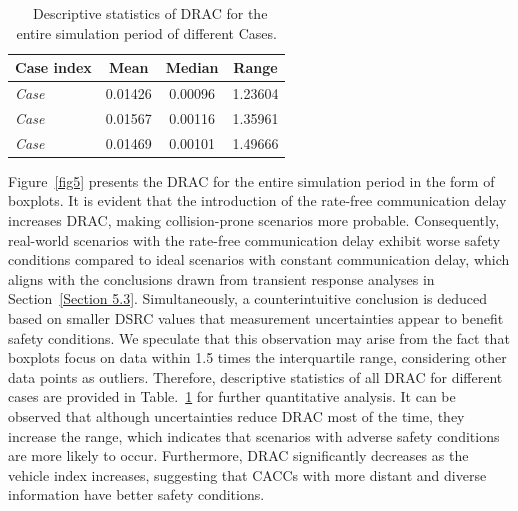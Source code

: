 \documentclass[a4paper]{cas-sc}
\begin{document}
\begin{table}
  \centering
  \setlength{\abovecaptionskip}{0pt}
  \setlength{\belowcaptionskip}{10pt}%
    \caption{~Descriptive statistics of DRAC for the entire simulation period of different Cases.}
    \label{table2}
    {\begin{tabular}{lccc} \toprule
        Case index                              & 
         Mean       & Median    &  Range    \\ \midrule
        \textit{Case \uppercase\expandafter{\romannumeral1}}                   & 0.01426  & 0.00096 &  1.23604     \\
        \textit{Case \uppercase\expandafter{\romannumeral2}}      & 0.01567 & 0.00116 &   1.35961         \\
        \textit{Case \uppercase\expandafter{\romannumeral3}}                    & 0.01469 & 0.00101 &  1.49666 \\
        \bottomrule
      \end{tabular}}
\end{table}

Figure~\ref{fig5} presents the DRAC for the entire simulation period in the form of boxplots. It is evident that the introduction of the rate-free communication delay increases DRAC, making collision-prone scenarios more probable. Consequently, real-world scenarios with the rate-free communication delay exhibit worse safety conditions compared to ideal scenarios with constant communication delay, which aligns with the conclusions drawn from transient response analyses in Section~\ref{Section 5.3}. Simultaneously, a counterintuitive conclusion is deduced based on smaller DSRC values that measurement uncertainties appear to benefit safety conditions. We speculate that this observation may arise from the fact that boxplots focus on data within 1.5 times the interquartile range, considering other data points as outliers. Therefore, descriptive statistics of all DRAC for different cases are provided in Table.~\ref{table2} for further quantitative analysis. It can be observed that although uncertainties reduce DRAC most of the time, they increase the range, which indicates that scenarios with adverse safety conditions are more likely to occur. Furthermore, DRAC significantly decreases as the vehicle index increases, suggesting that CACCs with more distant and diverse information have better safety conditions.
\end{document}
